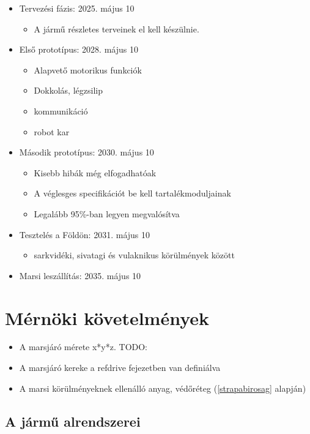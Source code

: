 \documentclass[12pt]{report}
\begin{document}
\begin{itemize}
  \item Tervezési fázis: 2025. május 10
  \begin{itemize}
    \item A jármű részletes terveinek el kell készülnie.
  \end{itemize}
  \item Első prototípus: 2028. május 10
  \begin{itemize}
    \item Alapvető motorikus funkciók
    \item Dokkolás, légzsilip
    \item kommunikáció
    \item robot kar
  \end{itemize}
  \item Második prototípus: 2030. május 10
  \begin{itemize}
    \item Kisebb hibák még elfogadhatóak
    \item A véglesges specifikációt be kell tartalékmoduljainak
    \item Legalább 95\%-ban legyen megvalósítva
  \end{itemize}
  \item Tesztelés a Földön: 2031. május 10
  \begin{itemize}
    \item sarkvidéki, sivatagi és vulaknikus körülmények között
  \end{itemize}
  \item Marsi leszállítás: 2035. május 10
\end{itemize}


\section{Mérnöki követelmények}
\begin{itemize}
  \item A marsjáró mérete x*y*z. TODO:
  \item A marsjáró kereke a ref{drive} fejezetben van definiálva \
  \item A marsi körülményeknek ellenálló anyag, védőréteg (\ref{strapabirosag} alapján)
\end{itemize}

\subsection{A jármű alrendszerei}\label{subsystems}
\end{document}

